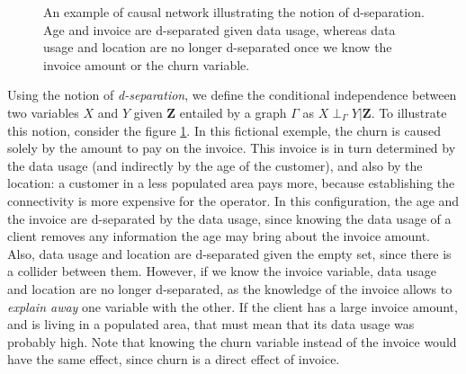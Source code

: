 \begin{figure}
    \centering
    \caption{An example of causal network illustrating the notion of
    d-separation. Age and invoice are d-separated given data usage, whereas data
    usage and location are no longer d-separated once we know the invoice amount
    or the churn variable.}
    \label{fig:d_sep}
\end{figure}

Using the notion of \emph{d-separation}, we define the conditional independence
between two variables $X$ and $Y$ given $\bm Z$ entailed by a graph $\Gamma$ as
$X\perp_\Gamma Y|\bm Z$. To illustrate this notion, consider the figure
\ref{fig:d_sep}. In this fictional exemple, the churn is caused solely by the
amount to pay on the invoice. This invoice is in turn determined by the data
usage (and indirectly by the age of the customer), and also by the location: a
customer in a less populated area pays more, because establishing the
connectivity is more expensive for the operator. In this configuration, the age
and the invoice are d-separated by the data usage, since knowing the data usage
of a client removes any information the age may bring about the invoice amount.
Also, data usage and location are d-separated given the empty set, since there
is a collider between them. However, if we know the invoice variable, data usage
and location are no longer d-separated, as the knowledge of the invoice allows
to \emph{explain away} one variable with the other. If the client has a large
invoice amount, and is living in a populated area, that must mean that its data
usage was probably  high. Note that knowing the churn variable instead of the
invoice would have the same effect, since churn is a direct effect of invoice.

